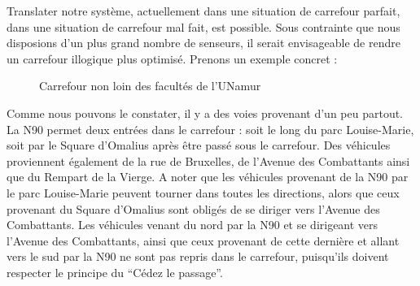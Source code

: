 Translater notre système, actuellement dans une situation de carrefour parfait, dans une situation de carrefour mal fait, est possible. Sous contrainte que nous disposions d’un plus grand nombre de senseurs, il serait envisageable de rendre un carrefour illogique plus optimisé. Prenons un exemple concret :

\begin{figure}[H]
    \begin{center}

        \caption{Carrefour non loin des facultés de l'UNamur}
    \end{center}
\end{figure}

Comme nous pouvons le constater, il y a des voies provenant d’un peu partout. La N90 permet deux entrées dans le carrefour : soit le long du parc Louise-Marie, soit par le Square d’Omalius après être passé sous le carrefour. Des véhicules proviennent également de la rue de Bruxelles, de l’Avenue des Combattants ainsi que du Rempart de la Vierge. A noter que les véhicules provenant de la N90 par le parc Louise-Marie peuvent tourner dans toutes les directions, alors que ceux provenant du Square d’Omalius sont obligés de se diriger vers l’Avenue des Combattants. Les véhicules venant du nord par la N90 et se dirigeant vers l’Avenue des Combattants, ainsi que ceux provenant de cette dernière et allant vers le sud par la N90 ne sont pas repris dans le carrefour, puisqu’ils doivent respecter le principe du “Cédez le passage”.

